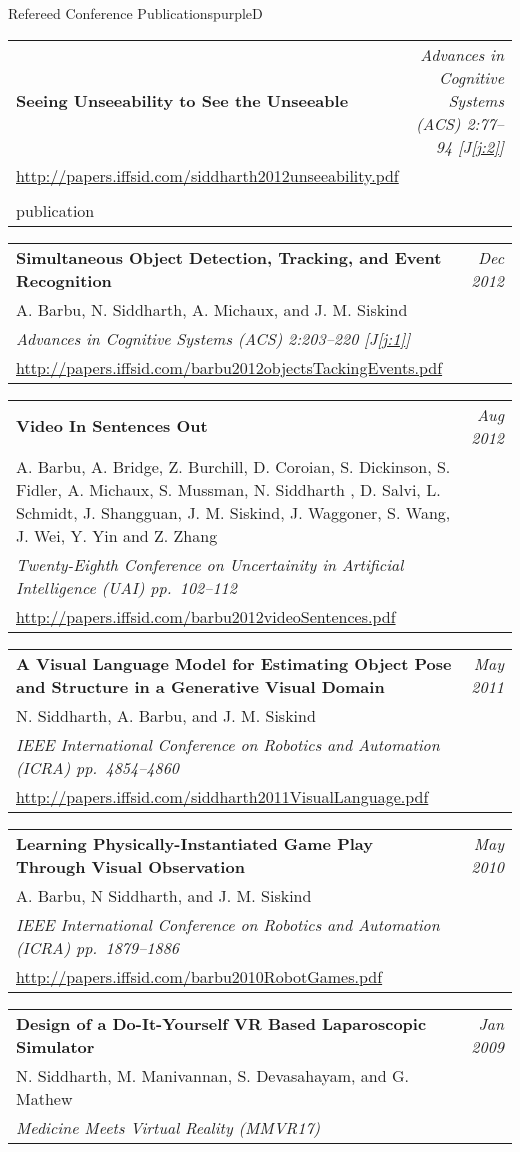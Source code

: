 \documentclass[a4paper]{article}
\makeatletter
\newlength{\itemtextwidth}
\newenvironment{publication}[5]
{ \item
  \begin{tabular*}{\itemtextwidth}{@{}p{5.6in}@{\extracolsep{\fill}}r@{}}
    \textbf{#1} & \textit{#2}\\ #3 &\\ \textit{#4}&\\ #5
  \end{tabular*}
  \vspace*{-2pt}
} {}
\def\item{\addtocounter{enumi}{-2}\oldItem}
\makeatother
\begin{document}
\begin{region}[C][11]{Refereed Conference Publications}{purpleD}
\begin{publication} {Seeing Unseeability to See the Unseeable}
    {Advances in Cognitive Systems (ACS) \hfill \emph{2:77--94} [{\color{blueGreen}J\ref{j:2}}]}
    {\url{http://papers.iffsid.com/siddharth2012unseeability.pdf}}
  \end{publication}
  \begin{publication} {Simultaneous Object Detection, Tracking, and Event Recognition}
    {Dec 2012}
    {A. Barbu, N. Siddharth, A. Michaux, and J. M. Siskind}
    {Advances in Cognitive Systems (ACS) \hfill \emph{2:203--220} [{\color{blueGreen}J\ref{j:1}}]}
    {\url{http://papers.iffsid.com/barbu2012objectsTackingEvents.pdf}}
  \end{publication}
  \begin{publication} {Video In Sentences Out}
    {Aug 2012}
    {A. Barbu, A. Bridge, Z. Burchill, D. Coroian, S. Dickinson, S. Fidler,
      A. Michaux, S. Mussman, N. Siddharth , D. Salvi, L. Schmidt, J. Shangguan,
      J. M. Siskind, J. Waggoner, S. Wang, J. Wei, Y. Yin and Z. Zhang}
    {Twenty-Eighth Conference on Uncertainity in Artificial Intelligence (UAI) \hfill\emph{pp.~102--112}}
    {\url{http://papers.iffsid.com/barbu2012videoSentences.pdf}}
  \end{publication}
  \begin{publication} {A Visual Language Model for Estimating Object
      Pose and Structure in a Generative Visual Domain}
    {May 2011}
    {N. Siddharth, A. Barbu, and J. M. Siskind}
    {IEEE International Conference on Robotics and Automation (ICRA) \hfill \emph{pp.~4854--4860}}
    {\url{http://papers.iffsid.com/siddharth2011VisualLanguage.pdf}}
  \end{publication}
  \begin{publication}{Learning Physically-Instantiated Game Play Through Visual Observation}
    {May 2010}
    {A. Barbu, N Siddharth, and J. M. Siskind}
    {IEEE International Conference on Robotics and Automation (ICRA) \hfill \emph{pp.~1879--1886}}
    {\url{http://papers.iffsid.com/barbu2010RobotGames.pdf}}
  \end{publication}
  \begin{publication} {Design of a Do-It-Yourself VR Based Laparoscopic Simulator}
    {Jan 2009}
    {N. Siddharth, M. Manivannan, S. Devasahayam, and G. Mathew}
    {Medicine Meets Virtual Reality (MMVR17)}
    {} %
  \end{publication}
\end{region}
\end{document}
